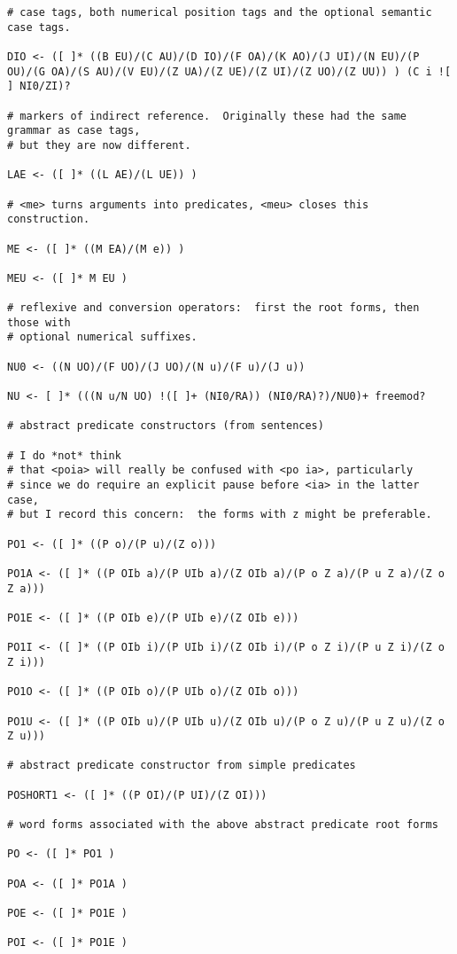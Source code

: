 \documentclass{article}
\begin{document}
\begin{verbatim}
# case tags, both numerical position tags and the optional semantic case tags.

DIO <- ([ ]* ((B EU)/(C AU)/(D IO)/(F OA)/(K AO)/(J UI)/(N EU)/(P OU)/(G OA)/(S AU)/(V EU)/(Z UA)/(Z UE)/(Z UI)/(Z UO)/(Z UU)) ) (C i ![ ] NI0/ZI)?

# markers of indirect reference.  Originally these had the same grammar as case tags,
# but they are now different.

LAE <- ([ ]* ((L AE)/(L UE)) )

# <me> turns arguments into predicates, <meu> closes this construction.

ME <- ([ ]* ((M EA)/(M e)) )

MEU <- ([ ]* M EU )

# reflexive and conversion operators:  first the root forms, then those with
# optional numerical suffixes.

NU0 <- ((N UO)/(F UO)/(J UO)/(N u)/(F u)/(J u))

NU <- [ ]* (((N u/N UO) !([ ]+ (NI0/RA)) (NI0/RA)?)/NU0)+ freemod?

# abstract predicate constructors (from sentences)

# I do *not* think
# that <poia> will really be confused with <po ia>, particularly
# since we do require an explicit pause before <ia> in the latter case,
# but I record this concern:  the forms with z might be preferable.

PO1 <- ([ ]* ((P o)/(P u)/(Z o)))

PO1A <- ([ ]* ((P OIb a)/(P UIb a)/(Z OIb a)/(P o Z a)/(P u Z a)/(Z o Z a)))

PO1E <- ([ ]* ((P OIb e)/(P UIb e)/(Z OIb e)))

PO1I <- ([ ]* ((P OIb i)/(P UIb i)/(Z OIb i)/(P o Z i)/(P u Z i)/(Z o Z i)))

PO1O <- ([ ]* ((P OIb o)/(P UIb o)/(Z OIb o)))

PO1U <- ([ ]* ((P OIb u)/(P UIb u)/(Z OIb u)/(P o Z u)/(P u Z u)/(Z o Z u)))

# abstract predicate constructor from simple predicates

POSHORT1 <- ([ ]* ((P OI)/(P UI)/(Z OI)))

# word forms associated with the above abstract predicate root forms

PO <- ([ ]* PO1 )

POA <- ([ ]* PO1A )

POE <- ([ ]* PO1E )

POI <- ([ ]* PO1E )


\end{verbatim}
\end{document}

